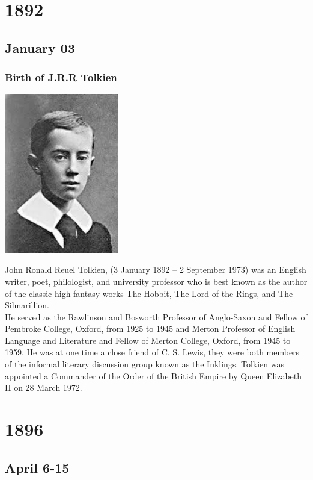 \documentclass[11pt]{report}
\begin{document}
\chapter{1892}
\section{January 03}
\subsection{Birth of J.R.R Tolkien}
\vspace{2mm}\begin{center}\includegraphics[width=5cm]{./img/youngTolkien.jpg}\end{center}
John Ronald Reuel Tolkien, (3 January 1892 – 2 September 1973) was an English writer, poet, philologist, and university professor who is best known as the author of the classic high fantasy works The Hobbit, The Lord of the Rings, and The Silmarillion.\\
He served as the Rawlinson and Bosworth Professor of Anglo-Saxon and Fellow of Pembroke College, Oxford, from 1925 to 1945 and Merton Professor of English Language and Literature and Fellow of Merton College, Oxford, from 1945 to 1959. He was at one time a close friend of C. S. Lewis, they were both members of the informal literary discussion group known as the Inklings. Tolkien was appointed a Commander of the Order of the British Empire by Queen Elizabeth II on 28 March 1972.

\chapter{1896}
\section{April 6-15}
\end{document}
